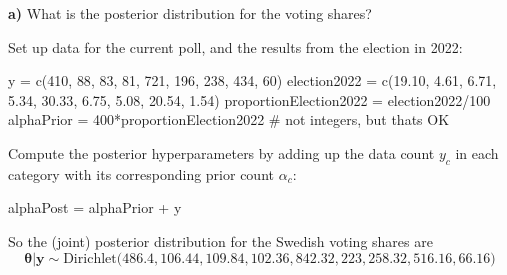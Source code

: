 \documentclass[
  letterpaper,
  DIV=11,
  numbers=noendperiod]{scrartcl}
\newenvironment{Shaded}{\begin{snugshade}}{\end{snugshade}}
\newcommand{\CommentTok}[1]{\textcolor[rgb]{0.37,0.37,0.37}{#1}}
\newcommand{\DecValTok}[1]{\textcolor[rgb]{0.68,0.00,0.00}{#1}}
\newcommand{\FloatTok}[1]{\textcolor[rgb]{0.68,0.00,0.00}{#1}}
\newcommand{\FunctionTok}[1]{\textcolor[rgb]{0.28,0.35,0.67}{#1}}
\newcommand{\NormalTok}[1]{\textcolor[rgb]{0.00,0.23,0.31}{#1}}
\newcommand{\OtherTok}[1]{\textcolor[rgb]{0.00,0.23,0.31}{#1}}
\newcommand{\SpecialCharTok}[1]{\textcolor[rgb]{0.37,0.37,0.37}{#1}}
\begin{document}
\textbf{a)} What is the posterior distribution for the voting shares?

\begin{tcolorbox}[enhanced jigsaw, title={Solution}, bottomtitle=1mm, opacityback=0, colback=white, colbacktitle=quarto-callout-note-color!10!white, breakable, left=2mm, colframe=quarto-callout-note-color-frame, coltitle=black, bottomrule=.15mm, leftrule=.75mm, toptitle=1mm, titlerule=0mm, arc=.35mm, rightrule=.15mm, opacitybacktitle=0.6, toprule=.15mm]

Set up data for the current poll, and the results from the election in
2022:

\begin{Shaded}
\begin{Highlighting}[]
\NormalTok{y }\OtherTok{=} \FunctionTok{c}\NormalTok{(}\DecValTok{410}\NormalTok{, }\DecValTok{88}\NormalTok{, }\DecValTok{83}\NormalTok{, }\DecValTok{81}\NormalTok{, }\DecValTok{721}\NormalTok{, }\DecValTok{196}\NormalTok{, }\DecValTok{238}\NormalTok{, }\DecValTok{434}\NormalTok{, }\DecValTok{60}\NormalTok{)}
\NormalTok{election2022 }\OtherTok{=} \FunctionTok{c}\NormalTok{(}\FloatTok{19.10}\NormalTok{, }\FloatTok{4.61}\NormalTok{, }\FloatTok{6.71}\NormalTok{, }\FloatTok{5.34}\NormalTok{, }\FloatTok{30.33}\NormalTok{, }\FloatTok{6.75}\NormalTok{, }\FloatTok{5.08}\NormalTok{, }\FloatTok{20.54}\NormalTok{, }\FloatTok{1.54}\NormalTok{)}
\NormalTok{proportionElection2022 }\OtherTok{=}\NormalTok{ election2022}\SpecialCharTok{/}\DecValTok{100}
\NormalTok{alphaPrior }\OtherTok{=} \DecValTok{400}\SpecialCharTok{*}\NormalTok{proportionElection2022 }\CommentTok{\# not integers, but that\textquotesingle{}s OK}
\end{Highlighting}
\end{Shaded}

Compute the posterior hyperparameters by adding up the data count
\(y_c\) in each category with its corresponding prior count
\(\alpha_c\):

\begin{Shaded}
\begin{Highlighting}[]
\NormalTok{alphaPost }\OtherTok{=}\NormalTok{ alphaPrior }\SpecialCharTok{+}\NormalTok{ y}
\end{Highlighting}
\end{Shaded}

So the (joint) posterior distribution for the Swedish voting shares are
\[
\boldsymbol{\theta} \vert \boldsymbol{y} \sim \mathrm{Dirichlet}\Big(486.4, 106.44, 109.84, 102.36, 842.32, 223, 258.32, 516.16, 66.16\Big)
\]

\end{tcolorbox}
\end{document}
